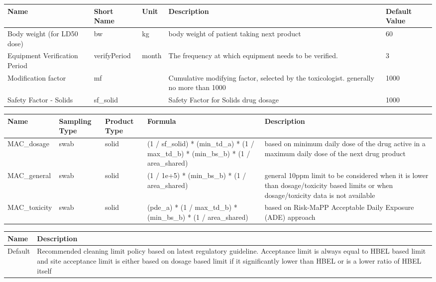 \documentclass{article}
\begin{document}
        \begin{longtable}[l]{|p{2.5cm}|p{2cm}|p{1.2cm}|p{8cm}|p{2cm}|}

\hline
Name & Short Name & Unit & Description & Default Value\\
\hline

Body weight (for LD50 dose) & bw & kg & body weight of patient taking next product & 60\\
\hline
Equipment Verification Period & verifyPeriod & month & The frequency at which equipment needs to be verified. & 3\\
\hline
Modification factor & mf &  & Cumulative modifying factor, selected by the toxicologist. generally no more than 1000 & 1000\\
\hline
Safety Factor - Solids & sf\_solid &  & Safety Factor for Solids drug dosage & 1000\\
\hline

    \end{longtable}
    
        \begin{longtable}[l]{|p{2.5cm}|p{1.5cm}|p{1.2cm}|p{5cm}|p{6cm}|}

\hline
Name & Sampling Type & Product Type & Formula & Description\\
\hline

MAC\_dosage & swab & solid & (1 / sf\_solid) * (min\_td\_a) * (1 / max\_td\_b) * (min\_bs\_b) * (1 / area\_shared) & based on minimum daily dose of the drug active in a maximum daily dose of the next drug product\\
\hline
MAC\_general & swab & solid & (1 / 1e+5) * (min\_bs\_b) * (1 / area\_shared) & general 10ppm limit to be considered when it is lower than dosage/toxicity based limits or when dosage/toxicity data is not available\\
\hline
MAC\_toxicity & swab & solid & (pde\_a) * (1 / max\_td\_b) * (min\_bs\_b) * (1 / area\_shared) & based on Risk-MaPP Acceptable Daily Exposure (ADE) approach\\
\hline

    \end{longtable}
    
        \begin{longtable}[l]{|p{1.5cm}|p{14cm}|}

\hline
Name & Description\\
\hline

Default & Recommended cleaning limit policy based on latest regulatory   guideline. Acceptance limit is always equal to HBEL based limit and site acceptance limit is either based   on dosage based limit if it significantly lower than HBEL or is a lower ratio of HBEL itself\\
\hline

    \end{longtable}
    
\end{document}
